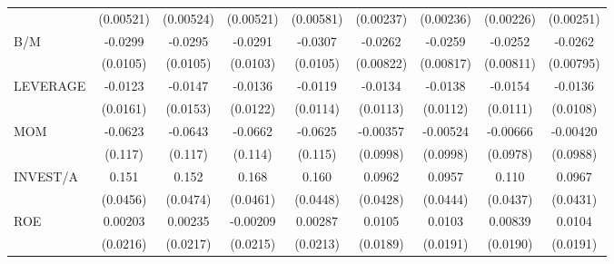 \begin{table}[htbp]
\begin{tabular}{l*{8}{c}}
                    &   (0.00521)         &   (0.00524)         &   (0.00521)         &   (0.00581)         &   (0.00237)         &   (0.00236)         &   (0.00226)         &   (0.00251)         \\
B/M                 &     -0.0299\sym{***}&     -0.0295\sym{***}&     -0.0291\sym{***}&     -0.0307\sym{***}&     -0.0262\sym{***}&     -0.0259\sym{***}&     -0.0252\sym{***}&     -0.0262\sym{***}\\
                    &    (0.0105)         &    (0.0105)         &    (0.0103)         &    (0.0105)         &   (0.00822)         &   (0.00817)         &   (0.00811)         &   (0.00795)         \\
LEVERAGE            &     -0.0123         &     -0.0147         &     -0.0136         &     -0.0119         &     -0.0134         &     -0.0138         &     -0.0154         &     -0.0136         \\
                    &    (0.0161)         &    (0.0153)         &    (0.0122)         &    (0.0114)         &    (0.0113)         &    (0.0112)         &    (0.0111)         &    (0.0108)         \\
MOM                 &     -0.0623         &     -0.0643         &     -0.0662         &     -0.0625         &    -0.00357         &    -0.00524         &    -0.00666         &    -0.00420         \\
                    &     (0.117)         &     (0.117)         &     (0.114)         &     (0.115)         &    (0.0998)         &    (0.0998)         &    (0.0978)         &    (0.0988)         \\
INVEST/A            &       0.151\sym{***}&       0.152\sym{***}&       0.168\sym{***}&       0.160\sym{***}&      0.0962\sym{**} &      0.0957\sym{**} &       0.110\sym{**} &      0.0967\sym{**} \\
                    &    (0.0456)         &    (0.0474)         &    (0.0461)         &    (0.0448)         &    (0.0428)         &    (0.0444)         &    (0.0437)         &    (0.0431)         \\
ROE                 &     0.00203         &     0.00235         &    -0.00209         &     0.00287         &      0.0105         &      0.0103         &     0.00839         &      0.0104         \\
                    &    (0.0216)         &    (0.0217)         &    (0.0215)         &    (0.0213)         &    (0.0189)         &    (0.0191)         &    (0.0190)         &    (0.0191)         \\

\end{tabular}
\end{table}
